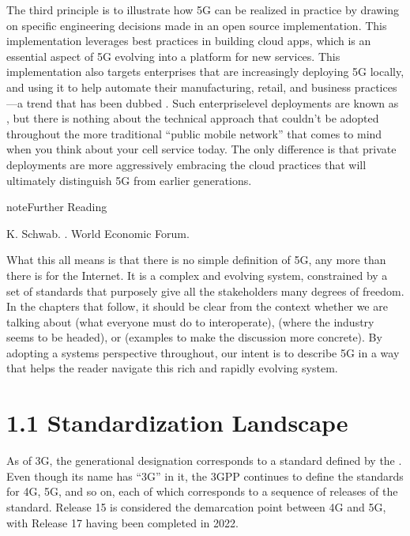 \documentclass[a4paper,11pt,english]{sphinxmanual}
\begin{document}
\sphinxAtStartPar
The third principle is to illustrate how 5G can be realized in
practice by drawing on specific engineering decisions made in an open
source implementation. This implementation leverages best practices in
building cloud apps, which is an essential aspect of 5G evolving into
a platform for new services. This implementation also targets
enterprises that are increasingly deploying 5G locally, and using it
to help automate their manufacturing, retail, and business practices—a
trend that has been dubbed . Such enterprise\sphinxhyphen{}level
deployments are known as , but there is nothing about the
technical approach that couldn’t be adopted throughout the more
traditional “public mobile network” that comes to mind when you think
about your cell service today. The only difference is that private
deployments are more aggressively embracing the cloud practices that
will ultimately distinguish 5G from earlier generations.

\label{\detokenize{intro:reading-industry4-0}}
\begin{sphinxadmonition}{note}{Further Reading}

\sphinxAtStartPar
K. Schwab. .
World Economic Forum.
\end{sphinxadmonition}

\sphinxAtStartPar
What this all means is that there is no simple definition of 5G, any
more than there is for the Internet. It is a complex and evolving
system, constrained by a set of standards that purposely give all the
stakeholders many degrees of freedom. In the chapters that follow, it
should be clear from the context whether we are talking about
 (what everyone must do to interoperate),  (where
the industry seems to be headed), or 
(examples to make the discussion more concrete). By adopting a systems
perspective throughout, our intent is to describe 5G in a way that
helps the reader navigate this rich and rapidly evolving system.


\section{1.1 Standardization Landscape}
\label{\detokenize{intro:standardization-landscape}}
\sphinxAtStartPar
As of 3G, the generational designation corresponds to a standard
defined by the . Even
though its name has “3G” in it, the 3GPP continues to define the
standards for 4G, 5G, and so on, each of which corresponds to a
sequence of releases of the standard. Release 15 is considered the
demarcation point between 4G and 5G, with Release 17 having been
completed in 2022.
\end{document}
